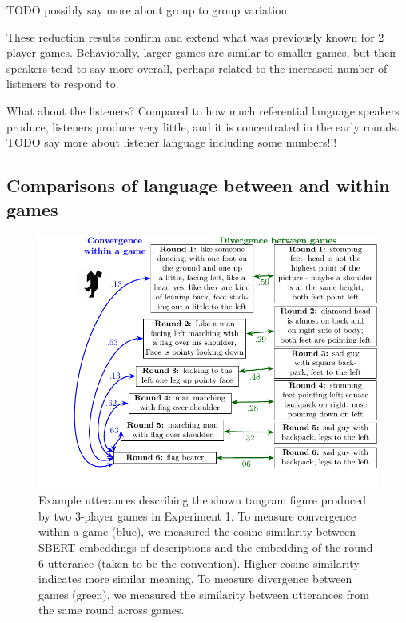\documentclass[
  english,
  a4paper,
]{article}
\begin{document}
TODO possibly say more about group to group variation

These reduction results confirm and extend what was previously known for 2 player games. Behaviorally, larger games are similar to smaller games, but their speakers tend to say more overall, perhaps related to the increased number of listeners to respond to.

What about the listeners? Compared to how much referential language speakers produce, listeners produce very little, and it is concentrated in the early rounds. TODO say more about listener language including some numbers!!!

\hypertarget{comparisons-of-language-between-and-within-games}{%
\subsection{Comparisons of language between and within games}\label{comparisons-of-language-between-and-within-games}}

\begin{figure}[t!]

{\centering \includegraphics[width=1\linewidth]{sbert} 

}

\caption{Example utterances describing the shown tangram figure produced by two 3-player games in Experiment 1. To measure convergence within a game (blue), we measured the cosine similarity between SBERT embeddings of descriptions and the embedding of the round 6 utterance (taken to be the convention). Higher cosine similarity indicates more similar meaning. To measure divergence between games (green), we measured the similarity between utterances from the same round across games.}\label{fig:sbert-diagram}
\end{figure}
\end{document}
